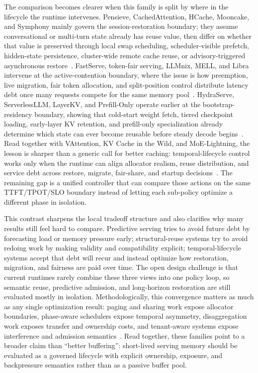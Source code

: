 \documentclass[acmsmall,screen,review]{acmart}
\begin{document}
The comparison becomes clearer when this family is split by where in the lifecycle the runtime intervenes. Pensieve, CachedAttention, HCache, Mooncake, and Symphony mainly govern the session-restoration boundary: they assume conversational or multi-turn state already has reuse value, then differ on whether that value is preserved through local swap scheduling, scheduler-visible prefetch, hidden-state persistence, cluster-wide remote cache reuse, or advisory-triggered asynchronous restore~\cite{yu2025pensieve,gao2025cachedattention,gao2025hcache,qin2025mooncake,agarwal2026symphony}. FastServe, token-fair serving, LLMnix, MELL, and Libra intervene at the active-contention boundary, where the issue is how preemption, live migration, fair token allocation, and split-position control distribute latency debt once many requests compete for the same memory pool~\cite{wu2026fastserve,sheng2024fairnessserving,sun2024llumnix,liu2025mell,ruan2026libra}. HydraServe, ServerlessLLM, LayerKV, and Prefill-Only operate earlier at the bootstrap-residency boundary, showing that cold-start weight fetch, tiered checkpoint loading, early-layer KV retention, and prefill-only specialization already determine which state can ever become reusable before steady decode begins~\cite{lou2026hydraserve,fu2024serverlessllm,xiong2024layerkv,du2025prefillonly}. Read together with VAttention, KV Cache in the Wild, and MoE-Lightning, the lesson is sharper than a generic call for better caching: temporal-lifecycle control works only when the runtime can align allocator realism, reuse distribution, and service debt across restore, migrate, fair-share, and startup decisions~\cite{prabhu2025vattention,wang2025kvcachewild,cao2025moelightning}. The remaining gap is a unified controller that can compare those actions on the same TTFT/TPOT/SLO boundary instead of letting each sub-policy optimize a different phase in isolation.

This contrast sharpens the local tradeoff structure and also clarifies why many results still feel hard to compare. Predictive serving tries to avoid future debt by forecasting load or memory pressure early; structural-reuse systems try to avoid redoing work by making validity and compatibility explicit; temporal-lifecycle systems accept that debt will recur and instead optimize how restoration, migration, and fairness are paid over time. The open design challenge is that current runtimes rarely combine these three views into one policy loop, so semantic reuse, predictive admission, and long-horizon restoration are still evaluated mostly in isolation. Methodologically, this convergence matters as much as any single optimization result: paging and sharing work expose allocator boundaries, phase-aware schedulers expose temporal asymmetry, disaggregation work exposes transfer and ownership costs, and tenant-aware systems expose interference and admission semantics~\cite{kwon2023pagedattention,agrawal2024sarathi,zhong2024distserve,patel2024splitwise,chen2024punica,li2023alpaserve,qin2026prfaas,guo2026splitzip,nian2026cacheflow}. Read together, these families point to a broader claim than ``better buffering'': short-lived serving memory should be evaluated as a governed lifecycle with explicit ownership, exposure, and backpressure semantics rather than as a passive buffer pool.
\end{document}
